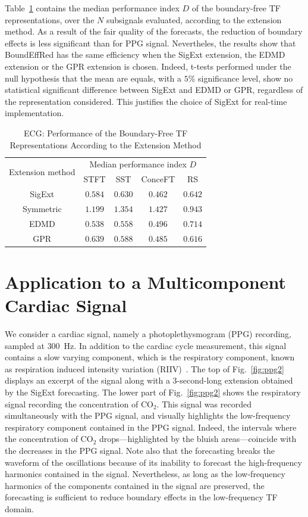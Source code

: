 \documentclass[journal,onecolumn]{IEEEtran}
\begin{document}
Table~\ref{tab:otd.ecg} contains the median performance index $D$ of the boundary-free TF representations, over the $N$ subsignals evaluated, according to the extension method. As a result of the fair quality of the forecasts, the reduction of boundary effects is less significant than for PPG signal. Nevertheles, the results show that {\sf BoundEffRed} has the same efficiency when the {\sf SigExt} extension, the EDMD extension or the GPR extension is chosen. Indeed, t-tests performed under the null hypothesis that the mean are equals, with a $5\%$ significance level, show no statistical significant difference between {\sf SigExt} and EDMD or GPR, regardless of the representation considered. This justifies the choice of {\sf SigExt} for real-time implementation.

\begin{table}
\centering
\caption{ECG: Performance of the Boundary-Free TF Representations According to the Extension Method}
\begin{tabular}{|c||c|c|c|c|}
  \hline
   \multirow{2}{40pt}{\centering Extension method} & \multicolumn{4}{c|}{Median performance index $D$} \\
   \cline{2-5}
      & STFT & SST & ConceFT & RS\\
   \hhline{|=#=|=|=|=|}
   {\sf SigExt} & $0.584$ & $0.630$ & $0.462$ & $0.642$ \\
   \hline
   Symmetric & $1.199$ & $1.354$ & $1.427$ & $0.943$ \\
   \hline
   EDMD & $0.538$ & $0.558$ & $0.496$ & $0.714$ \\
   \hline
   GPR & $0.639$ & $0.588$ & $0.485$ & $0.616$ \\
   \hline
\end{tabular}
\label{tab:otd.ecg}
\end{table}


\section{Application to a Multicomponent Cardiac Signal}
We consider a cardiac signal, namely a photoplethysmogram (PPG) recording, sampled at $300$~Hz. In addition to the cardiac cycle measurement, this signal contains a slow varying component, which is the respiratory component, known as respiration induced intensity variation (RIIV)~\cite{Nilsson13respiration}. The top of Fig.~\ref{fig:ppg2} displays an excerpt of the signal along with a 3-second-long extension obtained by the {\sf SigExt} forecasting. The lower part of Fig.~\ref{fig:ppg2} shows the respiratory signal recording the concentration of $\mathrm{CO}_2$. This signal was recorded simultaneously with the PPG signal, and visually highlights the low-frequency respiratory component contained in the PPG signal. Indeed, the intervals where the concentration of $\mathrm{CO}_2$ drops---highlighted by the bluish areas---coincide with the decreases in the PPG signal. Note also that the forecasting breaks the waveform of the oscillations because of its inability to forecast the high-frequency harmonics contained in the signal. Nevertheless, as long as the low-frequency harmonics of the components contained in the signal are preserved, the forecasting is sufficient to reduce boundary effects in the low-frequency TF domain.
\end{document}
